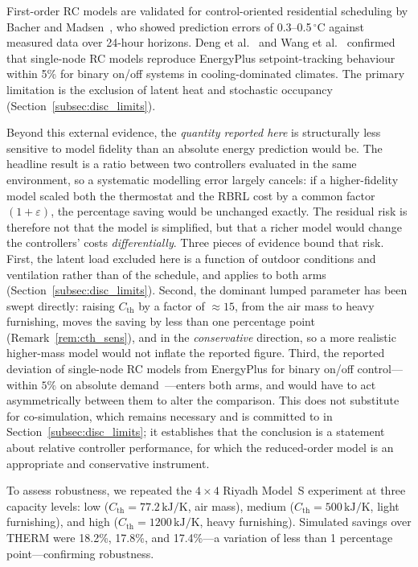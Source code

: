 \documentclass[3p,number]{elsarticle}
\newcommand{\Cth}{C_{\mathrm{th}}}
\begin{document}
\begin{remark}
\label{rem:rc_valid}
First-order RC models are validated for control-oriented residential
scheduling by Bacher and Madsen~\cite{Bacher2011}, who showed prediction
errors of 0.3--0.5\,$^\circ$C against measured data over 24-hour horizons.
Deng et al.~\cite{Deng2022} and Wang et al.~\cite{Wang2021RC} confirmed
that single-node RC models reproduce EnergyPlus setpoint-tracking
behaviour within 5\% for binary on/off systems in cooling-dominated
climates.
The primary limitation is the exclusion of latent heat and stochastic
occupancy (Section~\ref{subsec:disc_limits}).

Beyond this external evidence, the \emph{quantity reported here} is
structurally less sensitive to model fidelity than an absolute energy
prediction would be. The headline result is a ratio between two controllers
evaluated in the same environment, so a systematic modelling error largely
cancels: if a higher-fidelity model scaled both the thermostat and the RBRL cost
by a common factor $(1+\varepsilon)$, the percentage saving would be unchanged
exactly. The residual risk is therefore not that the model is simplified, but
that a richer model would change the controllers' costs \emph{differentially}.
Three pieces of evidence bound that risk. First, the latent load excluded here
is a function of outdoor conditions and ventilation rather than of the schedule,
and applies to both arms (Section~\ref{subsec:disc_limits}). Second, the
dominant lumped parameter has been swept directly: raising $\Cth$ by a factor of
${\approx}15$, from the air mass to heavy furnishing, moves the saving by less
than one percentage point (Remark~\ref{rem:cth_sens}), and in the
\emph{conservative} direction, so a more realistic higher-mass model would not
inflate the reported figure. Third, the reported deviation of single-node RC
models from EnergyPlus for binary on/off control---within $5\%$ on absolute
demand~\cite{Deng2022}---enters both arms, and would have to act asymmetrically
between them to alter the comparison. This does not substitute for
co-simulation, which remains necessary and is committed to in
Section~\ref{subsec:disc_limits}; it establishes that the conclusion is a
statement about relative controller performance, for which the reduced-order
model is an appropriate and conservative instrument.
\end{remark}
 
\begin{remark}
\label{rem:cth_sens}
To assess robustness, we repeated the $4\!\times\!4$ Riyadh Model~S
experiment at three capacity levels: low ($\Cth{=}77.2\,\text{kJ/K}$,
air mass), medium ($\Cth{=}500\,\text{kJ/K}$, light furnishing), and
high ($\Cth{=}1200\,\text{kJ/K}$, heavy furnishing).
Simulated savings over THERM were 18.2\%, 17.8\%, and 17.4\%---a variation of less
than 1 percentage point---confirming robustness.
\end{remark}
 
\end{document}
